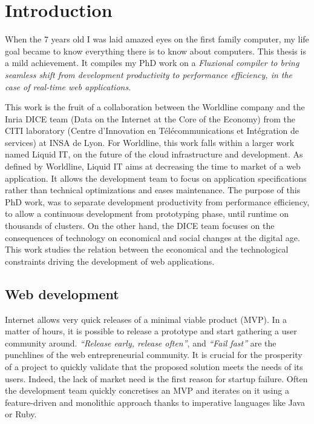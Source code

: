 \renewcommand{\glyph}{\iconfont{\XeTeXglyph198}}
\chapter{Introduction} \label{chapter:conclusion}
\minitoc
\eject

When the 7 years old I was laid amazed eyes on the first family computer, my life goal became to know everything there is to know about computers.
This thesis is a mild achievement.
It compiles my PhD work on a
\textit{Fluxional compiler to bring seamless shift from development productivity to performance efficiency, in the case of real-time web applications}.


This work is the fruit of a collaboration between the Worldline company and the Inria DICE team (Data on the Internet at the Core of the Economy) from the CITI laboratory (Centre d’Innovation en Télécommunications et Intégration
de services) at INSA de Lyon.
For Worldline, this work falls within a larger work named Liquid IT, on the future of the cloud infrastructure and development.
As defined by Worldline, Liquid IT aims at decreasing the time to market of a web application.
It allows the development team to focus on application specifications rather than technical optimizations and eases maintenance.
The purpose of this PhD work, was to separate development productivity from performance efficiency, to allow a continuous development from prototyping phase, until runtime on thousands of clusters.
On the other hand, the DICE team focuses on the consequences of technology on economical and social changes at the digital age.
This work studies the relation between the economical and the technological constraints driving the development of web applications.

\section{Web development}

Internet allows very quick releases of a minimal viable product (MVP).
In a matter of hours, it is possible to release a prototype and start gathering a user community around.
\textit{``Release early, release often''}, and \textit{``Fail fast''} are the punchlines of the web entrepreneurial community.
It is crucial for the prosperity of a project to quickly validate that the proposed solution meets the needs of its users.
Indeed, the lack of market need is the first reason for startup failure.
Often the development team quickly concretises an MVP and iterates on it using a feature-driven and monolithic approach thanks to imperative languages like Java or Ruby.

